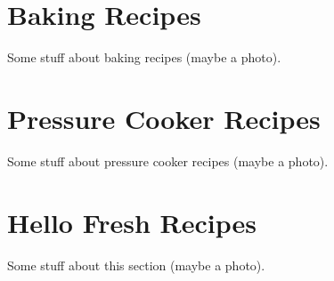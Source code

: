 \documentclass{article}
\begin{document}



\section{Baking Recipes}
Some stuff about baking recipes (maybe a photo).



\section{Pressure Cooker Recipes}
Some stuff about pressure cooker recipes (maybe a photo).


\section{Hello Fresh Recipes}
Some stuff about this section (maybe a photo).

\end{document}
